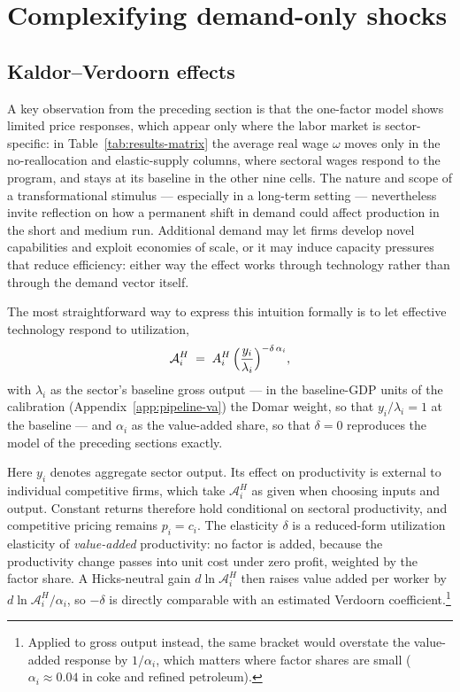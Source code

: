 \section{Complexifying demand-only shocks}\label{sec:beyond-demand-only}

\subsection{Kaldor--Verdoorn effects}\label{subsec:pricing-capacity}

A key observation from the preceding section is that the one-factor model shows limited price responses, which appear only where the labor market is sector-specific: in Table~\ref{tab:results-matrix} the average real wage $\omega$ moves only in the no-reallocation and elastic-supply columns, where sectoral wages respond to the program, and stays at its baseline in the other nine cells. The nature and scope of a transformational stimulus --- especially in a long-term setting --- nevertheless invite reflection on how a permanent shift in demand could affect production in the short and medium run. Additional demand may let firms develop novel capabilities and exploit economies of scale, or it may induce capacity pressures that reduce efficiency: either way the effect works through technology rather than through the demand vector itself.

The most straightforward way to express this intuition formally is to let
effective technology respond to utilization,
\begin{equation}\label{eq:capacity-extension}
  \mathcal{A}_i^{H} \;=\; A_i^{H}\,\Bigl(\frac{y_i}{\lambda_i}\Bigr)^{-\delta\,\alpha_i},
\end{equation}
with $\lambda_i$ as the sector's baseline gross output --- in the baseline-GDP units of the calibration (Appendix~\ref{app:pipeline-va}) the Domar weight, so that $y_i/\lambda_i = 1$ at the baseline --- and $\alpha_i$ as the value-added share, so that $\delta = 0$ reproduces the model of the preceding sections exactly.

Here $y_i$ denotes aggregate sector output. Its effect on productivity is external to individual competitive firms, which take $\mathcal{A}_i^{H}$ as given when choosing inputs and output. Constant returns therefore hold conditional on sectoral productivity, and competitive pricing remains $p_i=c_i$. The elasticity $\delta$ is a reduced-form utilization elasticity of \emph{value-added} productivity: no factor is added, because the productivity change passes into unit cost under zero profit, weighted by the factor share. A Hicks-neutral gain $d\ln \mathcal{A}_i^{H}$ then raises value added per worker by $d\ln \mathcal{A}_i^{H}/\alpha_i$, so $-\delta$ is directly comparable with an estimated Verdoorn coefficient.\footnote{Applied to gross output instead, the same bracket would overstate the value-added response by $1/\alpha_i$, which matters where factor shares are small ($\alpha_i \approx 0.04$ in coke and refined petroleum).}

